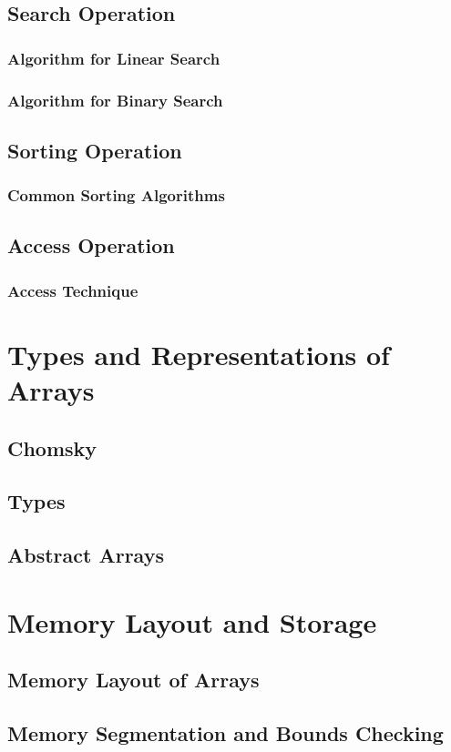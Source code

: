 \documentclass[12pt, oneside]{book}
\begin{document}
\section{Search Operation}
\subsection*{Algorithm for Linear Search}
\subsection*{Algorithm for Binary Search}
\section{Sorting Operation}
\subsection*{Common Sorting Algorithms}
\section{Access Operation}
\subsection*{Access Technique}
\chapter{Types and Representations of Arrays}
\section{Chomsky}
\section{Types}
\section{Abstract Arrays}
\chapter{Memory Layout and Storage}
\section{Memory Layout of Arrays}
\section{Memory Segmentation and Bounds Checking}
\end{document}
